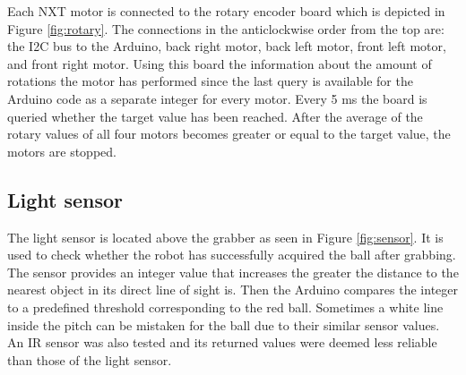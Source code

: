 \documentclass[a4paper,12pt]{article}
\begin{document}
Each NXT motor is connected to the rotary encoder board which is depicted in Figure \ref{fig:rotary}. The connections in the anticlockwise order from the top are: the I2C bus to the Arduino, back right motor, back left motor, front left motor, and front right motor. Using this board the information about the amount of rotations the motor has performed since the last query is available for the Arduino code as a separate integer for every motor. Every 5 ms the board is queried whether the target value has been reached. After the average of the rotary values of all four motors becomes greater or equal to the target value, the motors are stopped.

\subsection{Light sensor}

The light sensor is located above the grabber as seen in Figure \ref{fig:sensor}. It is used to check whether
the robot has successfully acquired the ball after grabbing. The sensor
provides an integer value that increases the greater the distance to the
nearest object in its direct line of sight is. Then the Arduino compares the integer
to a predefined threshold corresponding to the red ball. Sometimes a white
line inside the pitch can be mistaken for the ball due to their similar sensor
values. An IR sensor was also tested and its returned values were deemed less reliable than
those of the light sensor.
\end{document}
